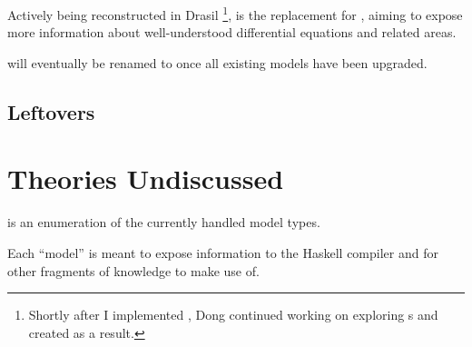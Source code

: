 Actively being reconstructed in Drasil \cite{Chen2022MEng} \footnote{Shortly
after I implemented \ModelKind{}, Dong continued working on exploring
\DEModel{}s and created \NewDEModel{} as a result.}, \NewDEModel{} is the
replacement for \DEModel{}, aiming to expose more information about
well-understood differential equations and related areas.

\NewDEModel{} will eventually be renamed to \DEModel{} once all existing
\DEModel{} models have been upgraded.
































\subsection{Leftovers}

























\section{Theories Undiscussed}

\ModelKinds{} is an enumeration of the currently handled model types.

Each ``model'' is meant to expose information to the Haskell compiler and for
other fragments of knowledge to make use of.

